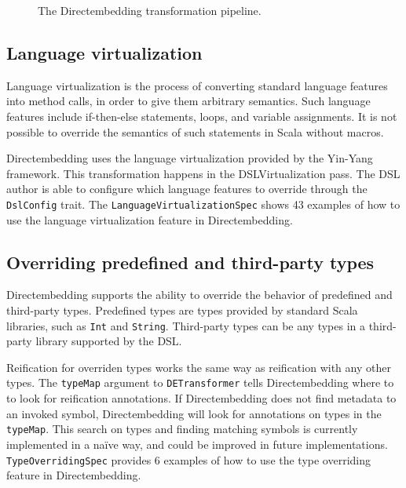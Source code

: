 \begin{figure}
    \centering
    \caption{The Directembedding transformation pipeline.}\label{fig:pipeline}
\end{figure}

\subsection{Language virtualization} %
\label{sub:LanguageVirtualization}
Language virtualization is the process of converting standard language features into method calls, in order to give them arbitrary semantics.
Such language features include if-then-else statements, loops, and variable assignments.
It is not possible to override the semantics of such statements in Scala without macros.

Directembedding uses the language virtualization provided by the Yin-Yang~\autocite{jovanovic_yin-yang:_2014} framework.
This transformation happens in the DSLVirtualization pass.
The DSL author is able to configure which language features to override through the \texttt{DslConfig} trait.
The \texttt{LanguageVirtualizationSpec} shows 43 examples of how to use the language virtualization feature in Directembedding.

\subsection{Overriding predefined and third-party types} %
\label{sub:Overridingpredefinedandthirdpartytypes}
Directembedding supports the ability to override the behavior of predefined and third-party types.
Predefined types are types provided by standard Scala libraries, such as \texttt{Int} and \texttt{String}.
Third-party types can be any types in a third-party library supported by the DSL.\

Reification for overriden types works the same way as reification with any other types.
The \texttt{typeMap} argument to \texttt{DETransformer} tells Directembedding where to to look for reification annotations.
If Directembedding does not find metadata to an invoked symbol, Directembedding will look for annotations on types in the \texttt{typeMap}.
This search on types and finding matching symbols is currently implemented in a naïve way, and could be improved in future implementations.
\texttt{TypeOverridingSpec} provides 6 examples of how to use the type overriding feature in Directembedding.

